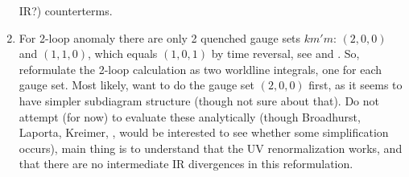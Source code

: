 \begin{enumerate}
IR?) counterterms.
  \item
For 2-loop anomaly there are only 2 quenched gauge sets $km'm$:
$(2,0,0)$ and $(1,1,0)$, which equals $(1,0,1)$ by time reversal, see
 and .
So, reformulate the 2-loop calculation as two worldline integrals,
one for each gauge set.
Most likely, want to do the gauge set $(2,0,0)$ first, as it seems to
have simpler subdiagram structure (though not sure about that).
Do not attempt (for now) to evaluate these analytically (though
Broadhurst, Laporta,
Kreimer, \etc, would be interested to see whether some simplification
occurs), main thing is to understand that the UV renormalization works,
and that there are no intermediate IR divergences in this reformulation.
\end{enumerate}

